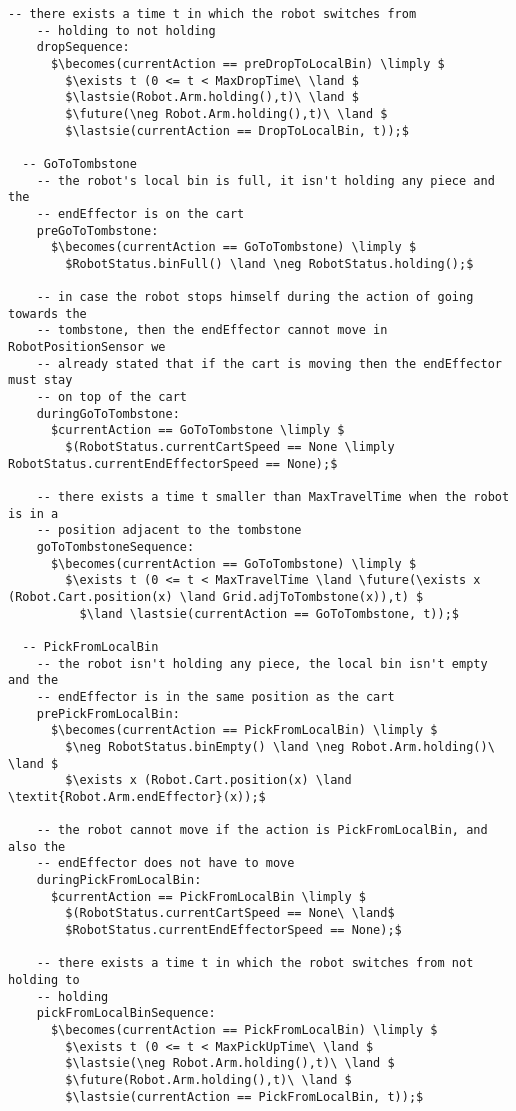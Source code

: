 \begin{lstlisting}[fontadjust, mathescape, frame=single]
    -- there exists a time t in which the robot switches from 
    -- holding to not holding
    dropSequence:
      $\becomes(currentAction == preDropToLocalBin) \limply $
        $\exists t (0 <= t < MaxDropTime\ \land $
        $\lastsie(Robot.Arm.holding(),t)\ \land $
        $\future(\neg Robot.Arm.holding(),t)\ \land $
        $\lastsie(currentAction == DropToLocalBin, t));$
  
  -- GoToTombstone
    -- the robot's local bin is full, it isn't holding any piece and the 
    -- endEffector is on the cart
    preGoToTombstone:
      $\becomes(currentAction == GoToTombstone) \limply $
        $RobotStatus.binFull() \land \neg RobotStatus.holding();$
    
    -- in case the robot stops himself during the action of going towards the 
    -- tombstone, then the endEffector cannot move in RobotPositionSensor we 
    -- already stated that if the cart is moving then the endEffector must stay 
    -- on top of the cart
    duringGoToTombstone:
      $currentAction == GoToTombstone \limply $
        $(RobotStatus.currentCartSpeed == None \limply RobotStatus.currentEndEffectorSpeed == None);$

    -- there exists a time t smaller than MaxTravelTime when the robot is in a 
    -- position adjacent to the tombstone
    goToTombstoneSequence:
      $\becomes(currentAction == GoToTombstone) \limply $
        $\exists t (0 <= t < MaxTravelTime \land \future(\exists x (Robot.Cart.position(x) \land Grid.adjToTombstone(x)),t) $
          $\land \lastsie(currentAction == GoToTombstone, t));$

  -- PickFromLocalBin
    -- the robot isn't holding any piece, the local bin isn't empty and the 
    -- endEffector is in the same position as the cart
    prePickFromLocalBin:
      $\becomes(currentAction == PickFromLocalBin) \limply $
        $\neg RobotStatus.binEmpty() \land \neg Robot.Arm.holding()\ \land $
        $\exists x (Robot.Cart.position(x) \land \textit{Robot.Arm.endEffector}(x));$
    
    -- the robot cannot move if the action is PickFromLocalBin, and also the 
    -- endEffector does not have to move
    duringPickFromLocalBin:
      $currentAction == PickFromLocalBin \limply $
        $(RobotStatus.currentCartSpeed == None\ \land$
        $RobotStatus.currentEndEffectorSpeed == None);$
  
    -- there exists a time t in which the robot switches from not holding to 
    -- holding
    pickFromLocalBinSequence:
      $\becomes(currentAction == PickFromLocalBin) \limply $
        $\exists t (0 <= t < MaxPickUpTime\ \land $
        $\lastsie(\neg Robot.Arm.holding(),t)\ \land $
        $\future(Robot.Arm.holding(),t)\ \land $
        $\lastsie(currentAction == PickFromLocalBin, t));$


\end{lstlisting}
